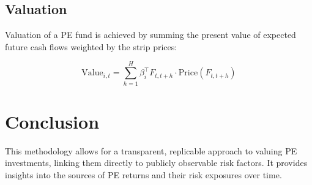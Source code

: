 \documentclass[12pt]{article}
\begin{document}
\subsection{Valuation}
Valuation of a PE fund is achieved by summing the present value of expected future cash flows weighted by the strip prices:

\begin{equation}
\text{Value}_{i,t} = \sum_{h=1}^{H} \beta_i^\top F_{t,t+h} \cdot \text{Price}(F_{t,t+h})
\end{equation}

\section{Conclusion}
This methodology allows for a transparent, replicable approach to valuing PE investments, linking them directly to publicly observable risk factors. It provides insights into the sources of PE returns and their risk exposures over time.
\end{document}
